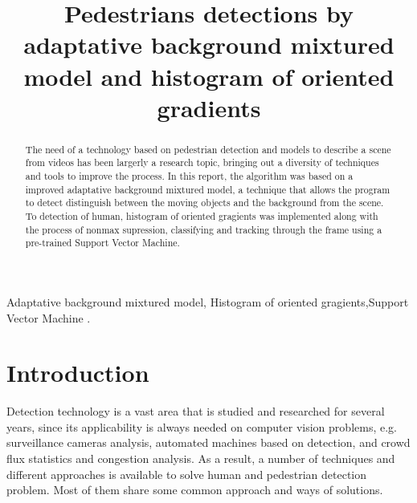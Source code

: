 \documentclass[conference]{IEEEtran}
\begin{document}
\title{Pedestrians detections by adaptative background mixtured model and histogram of oriented gradients\\
}

\author{
\and
{}
}

\maketitle

\begin{abstract}
The need of a technology based on pedestrian detection and models to describe a scene from videos has been largerly a research topic, bringing out a diversity of techniques and tools to improve the process. In this report, the algorithm was based on a improved adaptative  background mixtured model, a technique that allows the program to detect distinguish between the moving objects and the background from the scene. To detection of human, histogram of oriented gragients was implemented along with the process of nonmax supression, classifying and tracking through the frame using a  pre-trained Support Vector Machine.
\end{abstract}

\begin{IEEEkeywords}
Adaptative  background mixtured model, Histogram of oriented gragients,Support Vector Machine .
\end{IEEEkeywords}

\section{Introduction}

	Detection technology is a vast area that is studied and researched for several years, since its applicability is always needed on computer vision problems, e.g. surveillance cameras analysis, automated machines based on detection, and crowd flux
statistics and congestion analysis. As a result, a number of techniques and different approaches is available to solve human and pedestrian detection problem. Most of them share some common approach and ways of solutions. 
	
\end{document}
